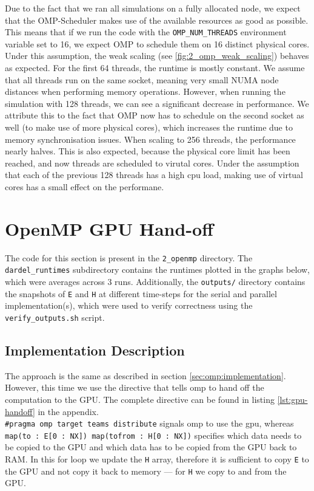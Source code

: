 \documentclass[a4paper,10pt]{article}
\begin{document}
\begin{multicols}{2}
Due to the fact that we ran all simulations on a fully allocated node, we expect that the OMP-Scheduler makes use of the available resources as good as possible.
This means that if we run the code with the \verb|OMP_NUM_THREADS| environment variable set to 16, we expect OMP to schedule them on 16 distinct physical cores.
Under this assumption, the weak scaling (see \ref{fig:2_omp_weak_scaling}) behaves as expected.
For the first 64 threads, the runtime is mostly constant.
We assume that all threads run on the same socket, meaning very small NUMA node distances when performing memory operations.
However, when running the simulation with 128 threads, we can see a significant decrease in performance.
We attribute this to the fact that OMP now has to schedule on the second socket as well (to make use of more physical cores), which increases the runtime due to memory synchronisation issues.
When scaling to 256 threads, the performance nearly halves.
This is also expected, because the physical core limit has been reached, and now threads are scheduled to virutal cores.
Under the assumption that each of the previous 128 threads has a high cpu load, making use of virtual cores has a small effect on the performane.

\section{OpenMP GPU Hand-off}
\label{sec:gpu}
The code for this section is present in the \verb|2_openmp| directory.
The \verb|dardel_runtimes| subdirectory contains the runtimes plotted in the graphs below, which were averages across 3 runs.
Additionally, the \verb|outputs/| directory contains the snapshots of \verb|E| and \verb|H| at different time-steps for the serial and parallel implementation(s), which were used to verify correctness using the \verb|verify_outputs.sh| script.

\subsection{Implementation Description}
\label{sec:gpu:implementation}
The approach is the same as described in section \ref{sec:omp:implementation}.
However, this time we use the directive that tells omp to hand off the computation to the GPU.
The complete directive can be found in listing \ref{lst:gpu-handoff} in the appendix.\\
\verb|#pragma omp target teams distribute| signals omp to use the gpu, whereas \\
\verb|map(to : E[0 : NX]) map(tofrom : H[0 : NX])| specifies which data needs to be copied to the GPU and which data has to be copied from the GPU back to RAM. In this for loop we update the \verb|H| array, therefore it is sufficient to copy \verb|E| to the GPU and not copy it back to memory --- for \verb|H| we copy to and from the GPU.


\end{multicols}
\end{document}
